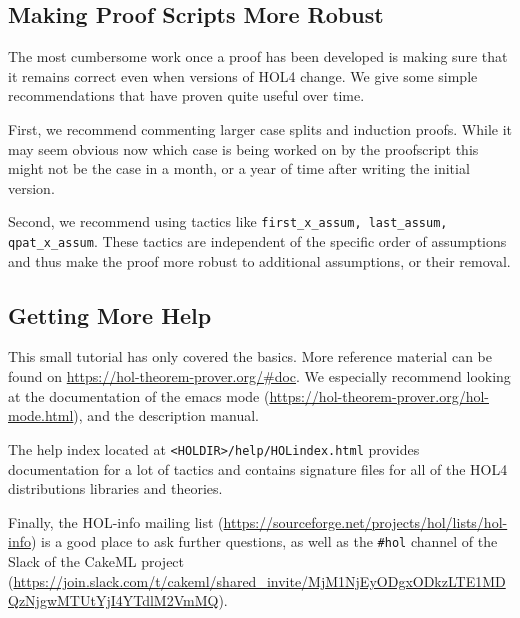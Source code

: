 \subsection{Making Proof Scripts More Robust}
The most cumbersome work once a proof has been developed is making sure that it
remains correct even when versions of HOL4 change.
We give some simple recommendations that have proven quite useful over time.

First, we recommend commenting larger case splits and induction proofs.
While it may seem obvious now which case is being worked on by the proofscript
this might not be the case in a month, or a year of time after writing the
initial version.

Second, we recommend using tactics like
\lstinline{first_x_assum, last_assum, qpat_x_assum}.
These tactics are independent of the specific order of assumptions and thus make
the proof more robust to additional assumptions, or their removal.


\subsection{Getting More Help}
This small tutorial has only covered the basics.
More reference material can be found on \url{https://hol-theorem-prover.org/#doc}.
We especially recommend looking at the documentation of the emacs mode
(\url{https://hol-theorem-prover.org/hol-mode.html}), and the description manual.

The help index located at \lstinline{<HOLDIR>/help/HOLindex.html} provides
documentation for a lot of tactics and contains signature files for all of the
HOL4 distributions libraries and theories.

Finally, the HOL-info mailing list
(\url{https://sourceforge.net/projects/hol/lists/hol-info}) is a good place to
ask further questions, as well as the \texttt{\#hol} channel of the Slack of the
CakeML project (\url{https://join.slack.com/t/cakeml/shared_invite/MjM1NjEyODgxODkzLTE1MDQzNjgwMTUtYjI4YTdlM2VmMQ}).
